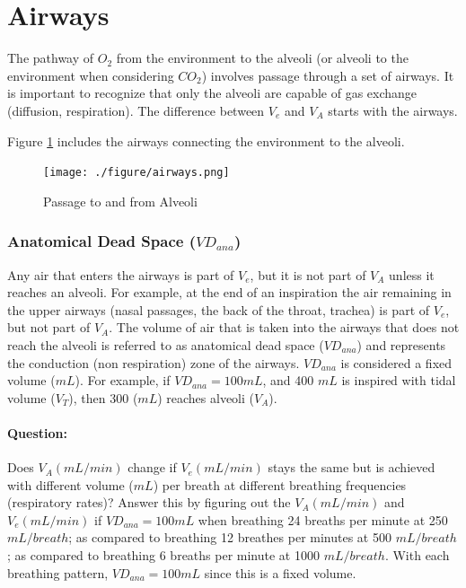 \section{Airways}

The pathway of $O_2$ from the environment to the alveoli (or alveoli to the environment when considering $CO_2$) involves passage through a set of airways. It is important to recognize that only the alveoli are capable of gas exchange (diffusion, respiration). The difference between $V_e$ and $V_A$ starts with the airways.  

Figure \ref{fig:airways} includes the airways connecting the environment to the alveoli.

\begin{figure}[!h]
    \centering
    \texttt{[image: ./figure/airways.png]}
    \caption{Passage to and from Alveoli}
    \label{fig:airways}
\end{figure}

\subsubsection{Anatomical Dead Space ($VD_{ana}$)}

Any air that enters the airways is part of $V_e$, but it is not part of $V_A$ unless it reaches an alveoli. For example, at the end of an inspiration the air remaining in the upper airways (nasal passages, the back of the throat, trachea) is part of $V_e$, but not part of $V_A$. The volume of air that is taken into the airways that does not reach the alveoli is referred to as anatomical dead space ($VD_{ana}$) and represents the conduction (non respiration) zone of the airways. $VD_{ana}$ is considered a fixed volume ($mL$). For example, if $VD_{ana} = 100 mL$, and 400 $mL$ is inspired with tidal volume ($V_T$), then 300 ($mL$) reaches alveoli ($V_A$). 

\paragraph{Question:}

Does $V_A (mL/min)$ change if $V_e (mL/min)$ stays the same but is achieved with different volume ($mL$) per breath at different breathing frequencies (respiratory rates)? Answer this by figuring out the $V_A (mL/min)$ and $V_e (mL/min)$ if $VD_{ana} = 100 mL$ when breathing 24 breaths per minute at 250 $mL/breath$; as compared to breathing 12 breathes per minutes at 500 $mL/breath$; as compared to breathing 6 breaths per minute at 1000 $mL/breath$. With each breathing pattern, $VD_{ana} = 100 mL$ since this is a fixed volume.

